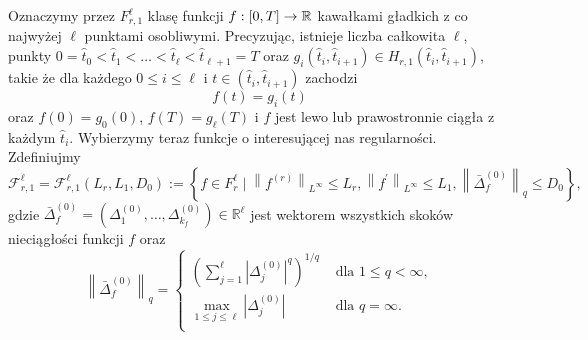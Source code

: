 \documentclass[oik, pdftex, robocza, man]{mgrwms}
\begin{document}
    Oznaczymy przez $F_{r, 1}^{\ell}$ klasę funkcji $f: [0,T] \rightarrow \mathbb{R}$ kawałkami gładkich z co najwyżej $\ell$ punktami osobliwymi. Precyzując, istnieje liczba całkowita $\ell$, punkty $0 = \hat{t}_{0} < \hat{t}_{1} < \ldots < \hat{t}_{\ell} < \hat{t}_{\ell + 1} = T$ oraz $g_{i}(\hat{t}_{i}, \hat{t}_{i+1}) \in H_{r, 1}(\hat{t}_{i},\hat{t}_{i+1})$, takie że dla każdego $0 \leq i \leq \ell$ i $t \in (\hat{t}_{i}, \hat{t}_{i+1})$ zachodzi
    \begin{equation*}
        f(t) = g_{i}(t)
    \end{equation*}
    oraz $f(0) = g_{0}(0)$, $f(T) = g_{\ell}(T)$ i $f$ jest lewo lub prawostronnie ciągła z każdym $\hat{t}_{i}$.
    Wybierzymy teraz funkcje o interesującej nas regularności. Zdefiniujmy
    \begin{equation*}
        \mathcal{F}_{r, 1}^{\ell}=\mathcal{F}_{r, 1}^{\ell}\left(L_{r}, L_{1}, D_{0}\right):=\left\{f \in F_{r}^{\ell} \mid\left\|f^{(r)}\right\|_{L^{\infty}} \leq L_{r},\left\|f^{\prime}\right\|_{L^{\infty}} \leq L_{1},\left\|\bar{\Delta}_{f}^{(0)}\right\|_{q} \leq D_{0}\right\},
    \end{equation*}
    gdzie $\bar{\Delta}_{f}^{(0)}=\left(\Delta_{1}^{(0)}, \ldots, \Delta_{k_{f}}^{(0)}\right) \in \mathbb{R}^{\ell}$ jest wektorem wszystkich skoków nieciągłości funkcji $f$ oraz
    \begin{equation*}
        \left\|\bar{\Delta}_{f}^{(0)}\right\|_{q}=\begin{cases}
            \displaystyle \left(\sum_{j=1}^{\ell}\left|\Delta_{j}^{(0)}\right|^{q}\right)^{1 / q}   & \text { dla } 1 \leq q< \infty, \\
            \displaystyle \max _{1 \leq j \leq \ell}\left|\Delta_{j}^{(0)}\right|                   & \text { dla } q = \infty. \\
        \end{cases}
    \end{equation*}
    
\end{document}
